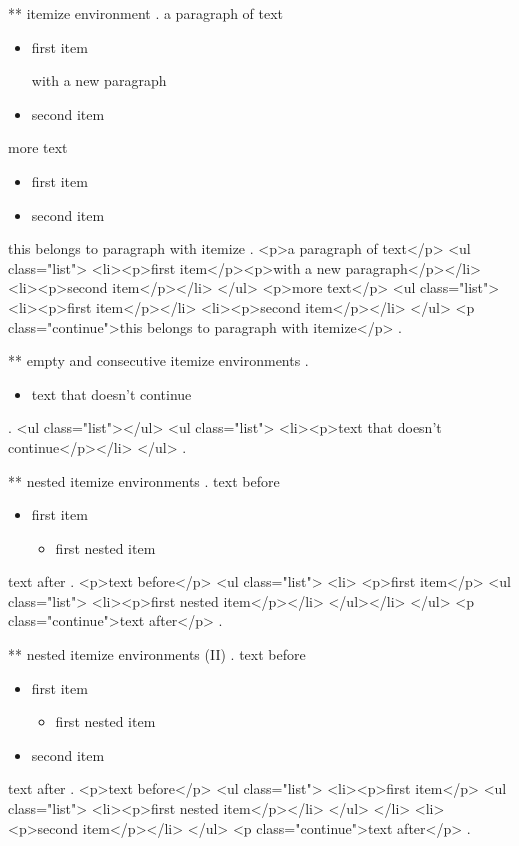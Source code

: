 ** itemize environment
.
a paragraph of text

\begin{itemize}
    \item first item

        with a new paragraph
    \item second item
\end{itemize}
%

more text

\begin{itemize}
    \item first item
    \item second item
\end{itemize}
this belongs to paragraph with itemize
.
<p>a paragraph of text</p>
<ul class="list">
<li><p>ﬁrst item</p><p>with a new paragraph</p></li>
<li><p>second item</p></li>
</ul>
<p>more text</p>
<ul class="list">
<li><p>ﬁrst item</p></li>
<li><p>second item</p></li>
</ul>
<p class="continue">this belongs to paragraph with itemize</p>
.


** empty and consecutive itemize environments
.
\begin{itemize}
\end{itemize}
\begin{itemize}
    \item text that doesn't continue
\end{itemize}
.
<ul class="list"></ul>
<ul class="list">
<li><p>text that doesn't continue</p></li>
</ul>
.


** nested itemize environments
.
text before
\begin{itemize}
    \item first item
        \begin{itemize}
            \item first nested item
        \end{itemize}
\end{itemize}
text after
.
<p>text before</p>
<ul class="list">
<li>
<p>ﬁrst item</p>
<ul class="list">
<li><p>ﬁrst nested item</p></li>
</ul></li>
</ul>
<p class="continue">text after</p>
.


** nested itemize environments (II)
.
text before
\begin{itemize}
    \item first item
        \begin{itemize}
            \item first nested item
        \end{itemize}
    \item second item
\end{itemize}
text after
.
<p>text before</p>
<ul class="list">
<li><p>ﬁrst item</p>
<ul class="list">
<li><p>ﬁrst nested item</p></li>
</ul>
</li>
<li><p>second item</p></li>
</ul>
<p class="continue">text after</p>
.


